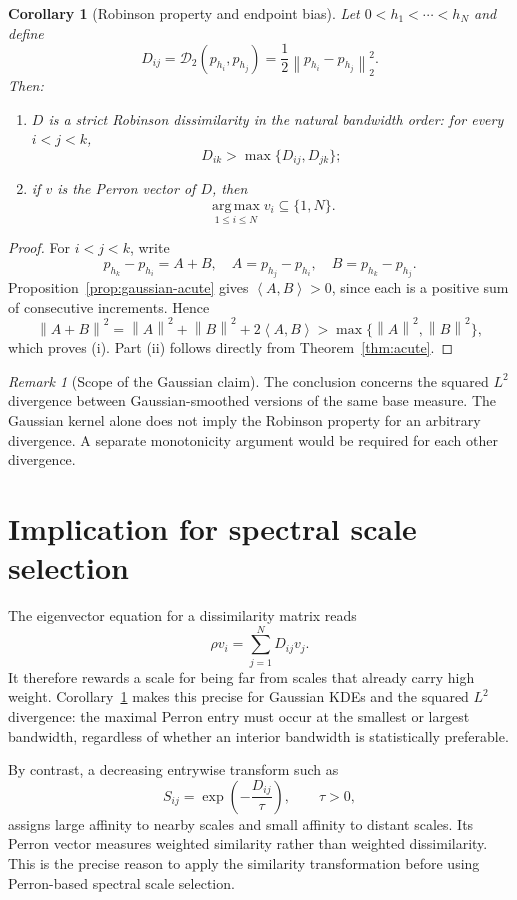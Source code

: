 \documentclass[11pt,a4paper]{article}
\theoremstyle{clean}
\newtheorem{corollary}[definition]{Corollary}
\theoremstyle{remark}
\newtheorem{remark}[definition]{Remark}
\newcommand{\ip}[2]{\left\langle #1,#2\right\rangle}
\newcommand{\norm}[1]{\left\lVert #1\right\rVert}
\newcommand{\argmax}{\operatorname*{arg\,max}}
\begin{document}
\begin{corollary}[Robinson property and endpoint bias]
\label{cor:main}
Let $0<h_1<\cdots<h_N$ and define
\[
  D_{ij}=\mathcal D_2(p_{h_i},p_{h_j})
  =\frac12\norm{p_{h_i}-p_{h_j}}_2^2.
\]
Then:
\begin{enumerate}[label=\textup{(\roman*)},leftmargin=2.3em]
  \item $D$ is a strict Robinson dissimilarity in the natural bandwidth order:
  for every $i<j<k$,
  \[
    D_{ik}>\max\{D_{ij},D_{jk}\};
  \]
  \item if $v$ is the Perron vector of $D$, then
  \[
    \argmax_{1\leq i\leq N}v_i\subseteq\{1,N\}.
  \]
\end{enumerate}
\end{corollary}

\begin{proof}
For $i<j<k$, write
\[
  p_{h_k}-p_{h_i}=A+B,
  \quad
  A=p_{h_j}-p_{h_i},
  \quad
  B=p_{h_k}-p_{h_j}.
\]
Proposition~\ref{prop:gaussian-acute} gives $\ip{A}{B}>0$, since each is a
positive sum of consecutive increments.  Hence
\[
  \norm{A+B}^2
  =\norm A^2+\norm B^2+2\ip AB
  >\max\{\norm A^2,\norm B^2\},
\]
which proves (i).  Part (ii) follows directly from
Theorem~\ref{thm:acute}.
\end{proof}

\begin{remark}[Scope of the Gaussian claim]
The conclusion concerns the squared $L^2$ divergence between Gaussian-smoothed
versions of the same base measure.  The Gaussian kernel alone does not imply
the Robinson property for an arbitrary divergence.  A separate monotonicity
argument would be required for each other divergence.
\end{remark}

\section{Implication for spectral scale selection}

The eigenvector equation for a dissimilarity matrix reads
\[
  \rho v_i=\sum_{j=1}^N D_{ij}v_j.
\]
It therefore rewards a scale for being far from scales that already carry high
weight.  Corollary~\ref{cor:main} makes this precise for Gaussian KDEs and the
squared $L^2$ divergence: the maximal Perron entry must occur at the smallest or
largest bandwidth, regardless of whether an interior bandwidth is statistically
preferable.

By contrast, a decreasing entrywise transform such as
\[
  S_{ij}=\exp\!\left(-\frac{D_{ij}}{\tau}\right),\qquad \tau>0,
\]
assigns large affinity to nearby scales and small affinity to distant scales.
Its Perron vector measures weighted similarity rather than weighted
dissimilarity.  This is the precise reason to apply the similarity
transformation before using Perron-based spectral scale selection.
\end{document}
